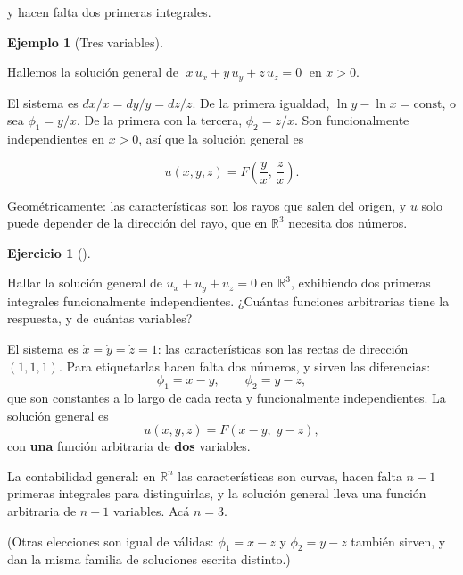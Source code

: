 \documentclass[
  spanish,
  a4paper,
]{scrbook}
\theoremstyle{definition}
\theoremstyle{plain}
\theoremstyle{definition}
\newtheorem{example}{Ejemplo}[chapter]
\theoremstyle{plain}
\theoremstyle{definition}
\newtheorem{exercise}{Ejercicio}[chapter]
\theoremstyle{remark}
\begin{document}
y hacen falta dos primeras integrales.

\begin{example}[Tres
variables]\protect\hypertarget{exm-tres-variables}{}\label{exm-tres-variables}

Hallemos la solución general de \(\;x\,u_x + y\,u_y + z\,u_z = 0\;\) en
\(x>0\).

El sistema es \(dx/x = dy/y = dz/z\). De la primera igualdad,
\(\ln y - \ln x = \text{const}\), o sea \(\phi_1 = y/x\). De la primera
con la tercera, \(\phi_2 = z/x\). Son funcionalmente independientes en
\(x>0\), así que la solución general es

\[
u(x,y,z) = F\!\left(\frac{y}{x},\, \frac{z}{x}\right).
\]

Geométricamente: las características son los rayos que salen del origen,
y \(u\) solo puede depender de la dirección del rayo, que en
\(\mathbb{R}^3\) necesita dos números.

\end{example}

\begin{exercise}[]\protect\hypertarget{exr-tres-variables-ej}{}\label{exr-tres-variables-ej}

Hallar la solución general de \(u_x + u_y + u_z = 0\) en
\(\mathbb{R}^3\), exhibiendo dos primeras integrales funcionalmente
independientes. ¿Cuántas funciones arbitrarias tiene la respuesta, y de
cuántas variables?

\end{exercise}

\begin{tcolorbox}[enhanced jigsaw, arc=.35mm, bottomrule=.15mm, bottomtitle=1mm, breakable, colback=white, colbacktitle=quarto-callout-tip-color!10!white, colframe=quarto-callout-tip-color-frame, coltitle=black, left=2mm, leftrule=.75mm, opacityback=0, opacitybacktitle=0.6, rightrule=.15mm, title=\textcolor{quarto-callout-tip-color}{\faLightbulb}\hspace{0.5em}{Solución}, titlerule=0mm, toprule=.15mm, toptitle=1mm]

El sistema es \(\dot x = \dot y = \dot z = 1\): las características son
las rectas de dirección \((1,1,1)\). Para etiquetarlas hacen falta dos
números, y sirven las diferencias:
\[\phi_1 = x - y, \qquad \phi_2 = y - z,\] que son constantes a lo largo
de cada recta y funcionalmente independientes. La solución general es
\[u(x,y,z) = F(x-y,\; y-z),\] con \textbf{una} función arbitraria de
\textbf{dos} variables.

La contabilidad general: en \(\mathbb{R}^n\) las características son
curvas, hacen falta \(n-1\) primeras integrales para distinguirlas, y la
solución general lleva una función arbitraria de \(n-1\) variables. Acá
\(n=3\).

(Otras elecciones son igual de válidas: \(\phi_1 = x-z\) y
\(\phi_2 = y-z\) también sirven, y dan la misma familia de soluciones
escrita distinto.)

\end{tcolorbox}
\end{document}
